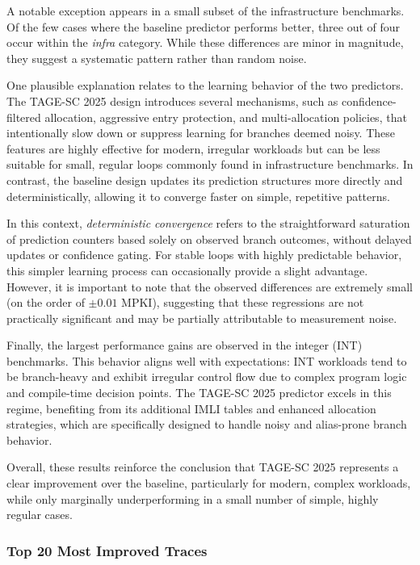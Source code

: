\documentclass[11pt,a4paper]{article}
\begin{document}
A notable exception appears in a small subset of the infrastructure benchmarks. Of the few cases where the baseline predictor performs better, three out of four occur within the \textit{infra} category. While these differences are minor in magnitude, they suggest a systematic pattern rather than random noise.

One plausible explanation relates to the learning behavior of the two predictors. The TAGE-SC 2025 design introduces several mechanisms, such as confidence-filtered allocation, aggressive entry protection, and multi-allocation policies, that intentionally slow down or suppress learning for branches deemed noisy. These features are highly effective for modern, irregular workloads but can be less suitable for small, regular loops commonly found in infrastructure benchmarks. In contrast, the baseline design updates its prediction structures more directly and deterministically, allowing it to converge faster on simple, repetitive patterns.

In this context, \textit{deterministic convergence} refers to the straightforward saturation of prediction counters based solely on observed branch outcomes, without delayed updates or confidence gating. For stable loops with highly predictable behavior, this simpler learning process can occasionally provide a slight advantage. However, it is important to note that the observed differences are extremely small (on the order of $\pm 0.01$ MPKI), suggesting that these regressions are not practically significant and may be partially attributable to measurement noise.

Finally, the largest performance gains are observed in the integer (INT) benchmarks. This behavior aligns well with expectations: INT workloads tend to be branch-heavy and exhibit irregular control flow due to complex program logic and compile-time decision points. The TAGE-SC 2025 predictor excels in this regime, benefiting from its additional IMLI tables and enhanced allocation strategies, which are specifically designed to handle noisy and alias-prone branch behavior.

Overall, these results reinforce the conclusion that TAGE-SC 2025 represents a clear improvement over the baseline, particularly for modern, complex workloads, while only marginally underperforming in a small number of simple, highly regular cases.
\subsubsection{Top 20 Most Improved Traces}
\end{document}
